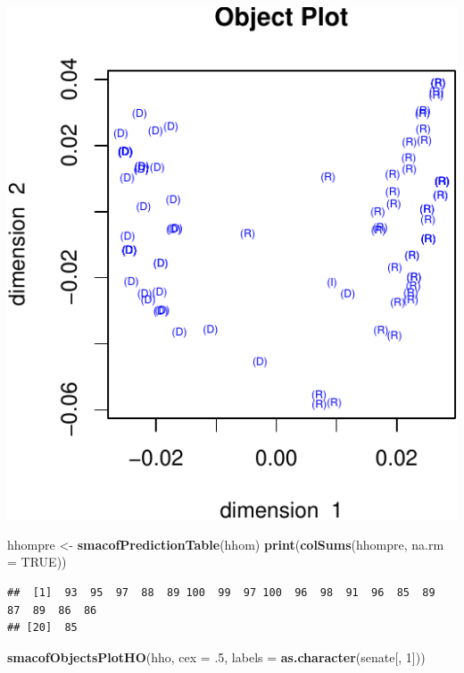 \documentclass[
  12pt,
]{article}
\newenvironment{Shaded}{\begin{snugshade}}{\end{snugshade}}
\newcommand{\AttributeTok}[1]{\textcolor[rgb]{0.13,0.29,0.53}{#1}}
\newcommand{\ConstantTok}[1]{\textcolor[rgb]{0.56,0.35,0.01}{#1}}
\newcommand{\DecValTok}[1]{\textcolor[rgb]{0.00,0.00,0.81}{#1}}
\newcommand{\FunctionTok}[1]{\textcolor[rgb]{0.13,0.29,0.53}{\textbf{#1}}}
\newcommand{\NormalTok}[1]{#1}
\newcommand{\OtherTok}[1]{\textcolor[rgb]{0.56,0.35,0.01}{#1}}
\begin{document}
\includegraphics{smacofHO_files/figure-latex/unnamed-chunk-4-1.pdf}

\begin{Shaded}
\begin{Highlighting}[]
\NormalTok{hhompre }\OtherTok{\textless{}{-}} \FunctionTok{smacofPredictionTable}\NormalTok{(hhom)}
\FunctionTok{print}\NormalTok{(}\FunctionTok{colSums}\NormalTok{(hhompre, }\AttributeTok{na.rm =} \ConstantTok{TRUE}\NormalTok{))}
\end{Highlighting}
\end{Shaded}

\begin{verbatim}
##  [1]  93  95  97  88  89 100  99  97 100  96  98  91  96  85  89  87  89  86  86
## [20]  85
\end{verbatim}

\begin{Shaded}
\begin{Highlighting}[]
\FunctionTok{smacofObjectsPlotHO}\NormalTok{(hho, }\AttributeTok{cex =}\NormalTok{ .}\DecValTok{5}\NormalTok{, }\AttributeTok{labels =} \FunctionTok{as.character}\NormalTok{(senate[, }\DecValTok{1}\NormalTok{]))}
\end{Highlighting}
\end{Shaded}
\end{document}
